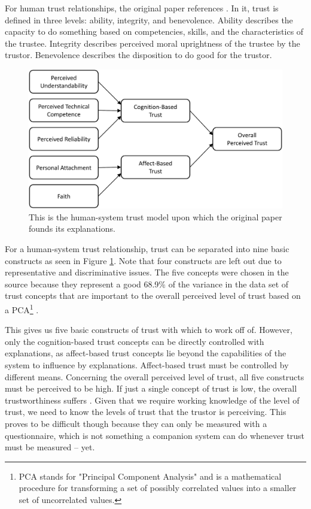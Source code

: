 \documentclass[a4paper]{article}
\begin{document}
For human trust relationships, the original paper references \cite{htc}. In it, trust is defined in three levels: ability, integrity, and benevolence. Ability describes the capacity to do something based on competencies, skills, and the characteristics of the trustee. Integrity describes perceived moral uprightness of the trustee by the trustor. Benevolence describes the disposition to do good for the trustor.

\begin{figure}[H]
	\centering
	\includegraphics[width=12cm]{trust.png}
	\caption{This is the human-system trust model upon which the original paper founds its explanations.}
	\label{fig:hs_trust}
\end{figure}

For a human-system trust relationship, trust can be separated into nine basic constructs as seen in Figure \ref{fig:hs_trust}. Note that four constructs are left out due to representative and discriminative issues. The five concepts were chosen in the source because they represent a good 68.9\% of the variance in the data set of trust concepts that are important to the overall perceived level of trust based on a PCA\footnote{PCA stands for "Principal Component Analysis" and is a mathematical procedure for transforming a set of possibly correlated values into a smaller set of uncorrelated values.} \cite{htc}.

This gives us five basic constructs of trust with which to work off of. However, only the cognition-based trust concepts can be directly controlled with explanations, as affect-based trust concepts lie beyond the capabilities of the system to influence by explanations. Affect-based trust must be controlled by different means. Concerning the overall perceived level of trust, all five constructs must be perceived to be high. If just a single concept of trust is low, the overall trustworthiness suffers \cite{htc}. Given that we require working knowledge of the level of trust, we need to know the levels of trust that the trustor is perceiving. This proves to be difficult though because they can only be measured with a questionnaire, which is not something a companion system can do whenever trust must be measured – yet.
\end{document}
